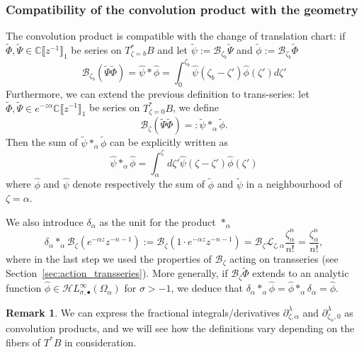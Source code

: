 \documentclass{article}
\newcommand{\singexp}[2]{\mathcal{H}L^\infty_{#1, #2}}
\newcommand{\singexpalg}[1]{\singexp{#1}{\bullet}}
\newcommand{\C}{\mathbb{C}}
\newcommand{\series}[1]{\tilde{#1}}
\newcommand{\fracderiv}[3]{\partial^{#1}_{#2, #3}}
\newcommand{\laplace}{\mathcal{L}}
\newcommand{\borel}{\mathcal{B}}
\theoremstyle{definition}
\newtheorem{remark}[definition]{Remark}
\theoremstyle{plain}
\newenvironment{verify}{\color{ForestGreen}}{\color{black}}
\begin{document}
\begin{verify}
\subsubsection{Compatibility of the convolution product with the geometry}\label{sec:convolution-compatible}
The convolution product is compatible with the change of translation chart: if $\series{\Phi}, \series{\Psi}\in \C \llbracket z^{-1} \rrbracket_1$ be series on $T^*_{\zeta=b}B$ and let $\series{\psi}:=\borel_{\zeta_b}\series{\Psi}$ and $\series{\phi}:=\borel_{\zeta_b}\series{\Phi}$
\[\borel_{\zeta_b}(\series{\Psi}\series{\Phi})=\hat{\psi}\ast \hat{\phi}=\int_{0}^{\zeta_b}\hat{\psi}(\zeta_b-\zeta')\hat{\phi}(\zeta')d\zeta'\]
Furthermore, we can extend the previous definition to trans-series: let $\series{\Phi}, \series{\Psi}\in e^{-z\alpha}\C \llbracket z^{-1} \rrbracket_1$ be series on $T^*_{\zeta=0} B$, we define \[\borel_{\zeta}(\series{\Psi}\series{\Phi})=:\series{\psi}\ast_\alpha\series{\phi}.\]
Then the sum of $\series{\psi}\ast_\alpha\series{\phi}$ can be explicitly written as 
\begin{equation}
    \hat{\psi}\ast_\alpha\hat{\phi}=\int_\alpha^{\zeta}d\zeta' \hat{\psi}(\zeta-\zeta')\hat{\phi}(\zeta')
\end{equation}
where $\hat{\phi}$ and $\hat{\psi}$ denote respectively the sum of $\series{\phi}$ and $\series{\psi}$ in a neighbourhood of $\zeta=\alpha$. 

We also introduce $\delta_\alpha$ as the unit for the product $\ast_\alpha$
\[\delta_\alpha\ast_\alpha\borel_\zeta(e^{-\alpha z}z^{-n-1}):=\borel_\zeta(1\cdot e^{-\alpha z} z^{-n-1})=\borel_\zeta\laplace_{\zeta,\alpha}\frac{\zeta_\alpha^n}{n!}=\frac{\zeta_\alpha^n}{n!},\]
where in the last step we used the properties of $\borel_\zeta$ acting on transseries (see Section~\ref{sec:action_transseries}).
More generally, if $\borel_\zeta\series{\Phi}$ extends to an analytic function $\hat{\phi}\in\singexpalg{\sigma}(\Omega_\alpha)$ for $\sigma>-1$, we deduce that $\delta_\alpha\ast_\alpha\hat{\phi}=\hat{\phi}\ast_\alpha\delta_\alpha=\hat{\phi}$. 
\begin{remark}
We can express the fractional integrals/derivatives $\fracderiv{\lambda}{\zeta}{\alpha}$ and $\fracderiv{\lambda}{\zeta_\alpha}{0}$ as convolution products, and we will see how the definitions vary depending on the fibers of $T^*B$ in consideration. 


\end{remark}
\end{verify}
\end{document}
